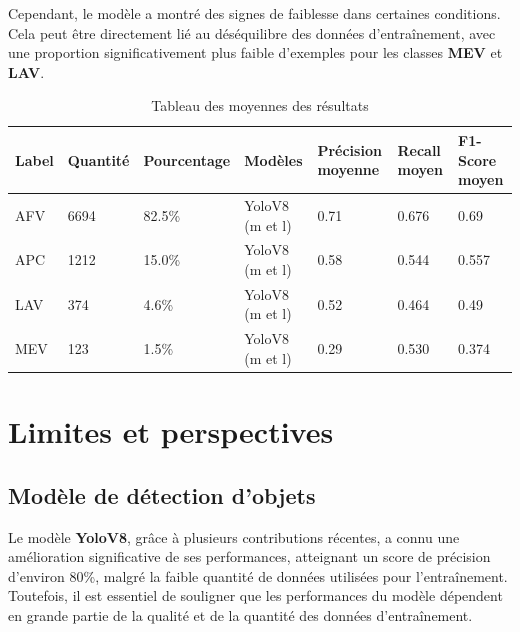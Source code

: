 Cependant, le modèle a montré des signes de faiblesse dans certaines conditions. Cela peut être directement lié au déséquilibre des données d'entraînement, avec une proportion significativement plus faible d'exemples pour les classes \textbf{MEV} et \textbf{LAV}.

\begin{table}[H]
    \centering
    \begin{tabular}{|l|l|l|p{2.8cm}|p{2cm}|p{2cm}|p{2cm}|}
        \hline
        \textbf{Label} & \textbf{Quantité} & \textbf{Pourcentage} & \textbf{Modèles} & \textbf{Précision moyenne} & \textbf{Recall moyen} & \textbf{F1-Score moyen} \\ \hline
        AFV            & 6694              & 82.5\%               & YoloV8 (m et l)  & 0.71                       & 0.676                 & 0.69                    \\ \hline
        APC            & 1212              & 15.0\%               & YoloV8 (m et l)  & 0.58                       & 0.544                 & 0.557                   \\ \hline
        LAV            & 374               & 4.6\%                & YoloV8 (m et l)  & 0.52                       & 0.464                 & 0.49                    \\ \hline
        MEV            & 123               & 1.5\%                & YoloV8 (m et l)  & 0.29                       & 0.530                 & 0.374                   \\ \hline
    \end{tabular}
    \caption{Tableau des moyennes des résultats}
    \label{tab:label_data}
\end{table}

\section{Limites et perspectives}

\subsection{Modèle de détection d'objets}
Le modèle \textbf{YoloV8}, grâce à plusieurs contributions récentes, a connu une amélioration significative de ses performances, atteignant un score de précision d'environ 80\%, malgré la faible quantité de données utilisées pour l'entraînement. Toutefois, il est essentiel de souligner que les performances du modèle dépendent en grande partie de la qualité et de la quantité des données d'entraînement.


